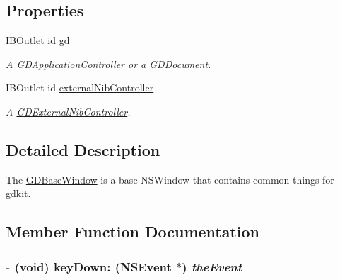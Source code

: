 \subsection*{Properties}
\begin{DoxyCompactItemize}
\item 
\hypertarget{interface_g_d_base_window_a7c6c34f29356d23e861917432eec617c}{
IBOutlet id \hyperlink{interface_g_d_base_window_a7c6c34f29356d23e861917432eec617c}{gd}}
\label{interface_g_d_base_window_a7c6c34f29356d23e861917432eec617c}

\begin{DoxyCompactList}\small\item\em A \hyperlink{interface_g_d_application_controller}{GDApplicationController} or a \hyperlink{interface_g_d_document}{GDDocument}. \item\end{DoxyCompactList}\item 
\hypertarget{interface_g_d_base_window_a446a42ac7f6e6bbab6f16a6d27eb139b}{
IBOutlet id \hyperlink{interface_g_d_base_window_a446a42ac7f6e6bbab6f16a6d27eb139b}{externalNibController}}
\label{interface_g_d_base_window_a446a42ac7f6e6bbab6f16a6d27eb139b}

\begin{DoxyCompactList}\small\item\em A \hyperlink{interface_g_d_external_nib_controller}{GDExternalNibController}. \item\end{DoxyCompactList}\end{DoxyCompactItemize}


\subsection{Detailed Description}
The \hyperlink{interface_g_d_base_window}{GDBaseWindow} is a base NSWindow that contains common things for gdkit. 

\subsection{Member Function Documentation}
\hypertarget{interface_g_d_base_window_aca77773c0363f56af6e2586ae60c6d7d}{
\subsubsection[{keyDown:}]{\setlength{\rightskip}{0pt plus 5cm}-\/ (void) keyDown: (NSEvent $\ast$) {\em theEvent}}}
\label{interface_g_d_base_window_aca77773c0363f56af6e2586ae60c6d7d}


